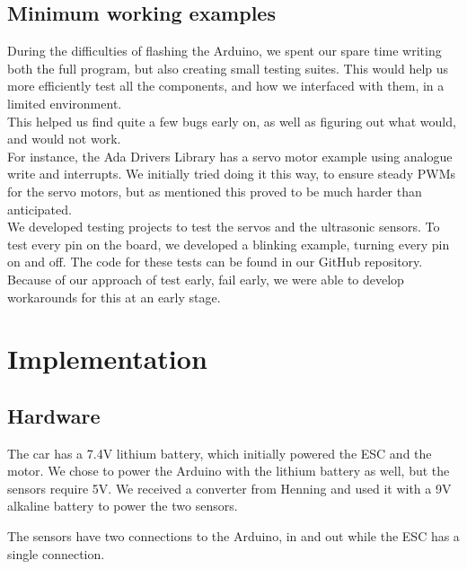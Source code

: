 \documentclass{article}
\begin{document}
\subsection{Minimum working examples}

During the difficulties of flashing the Arduino, we spent our spare time writing both the full program, but also creating small testing suites. This would help us more efficiently test all the components, and how we interfaced with them, in a limited environment.\\

This helped us find quite a few bugs early on, as well as figuring out what would, and would not work.\\

For instance, the Ada Drivers Library has a servo motor example using analogue write and interrupts. We initially tried doing it this way, to ensure steady PWMs for the servo motors, but as mentioned this proved to be much harder than anticipated.\\

We  developed testing projects to test the servos and the ultrasonic sensors. To test every pin on the board, we developed a blinking example, turning every pin on and off. The code for these tests can be found in our GitHub repository.\\

Because of our approach of test early, fail early, we were able to develop workarounds for this at an early stage.\\

\section{Implementation}

\subsection{Hardware}
The car has a 7.4V lithium battery, which initially powered the ESC and the motor. We chose to power the Arduino with the lithium battery as well, but the sensors require 5V. We received a converter from Henning and used it with a 9V alkaline battery to power the two sensors.

The sensors have two connections to the Arduino, in and out while the ESC has a single connection.
\end{document}
